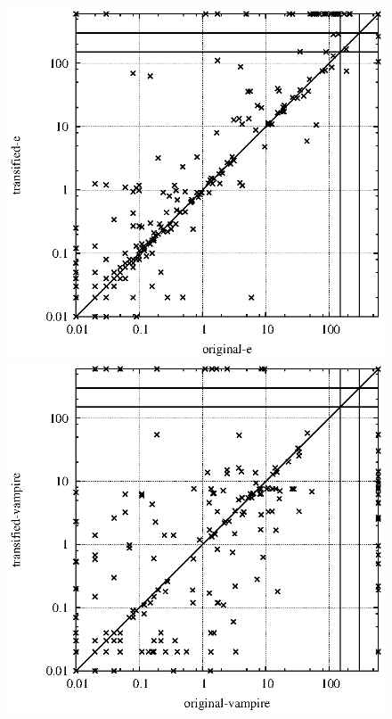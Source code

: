 \documentclass{article}
\begin{document}

\begin{figure}[t]
\begin{center}
\includegraphics[scale=0.65,trim=10mm 00mm 20mm 0mm]{Plots/OnlyTransify/E/test_original_e_transified_e_300.eps}
\includegraphics[scale=0.65,trim=10mm 0mm 20mm 0mm]{Plots/OnlyTransify/Vampire/test_original_vampire_transified_vampire_300.eps}\\

\end{center}
\end{figure}
\end{document}
